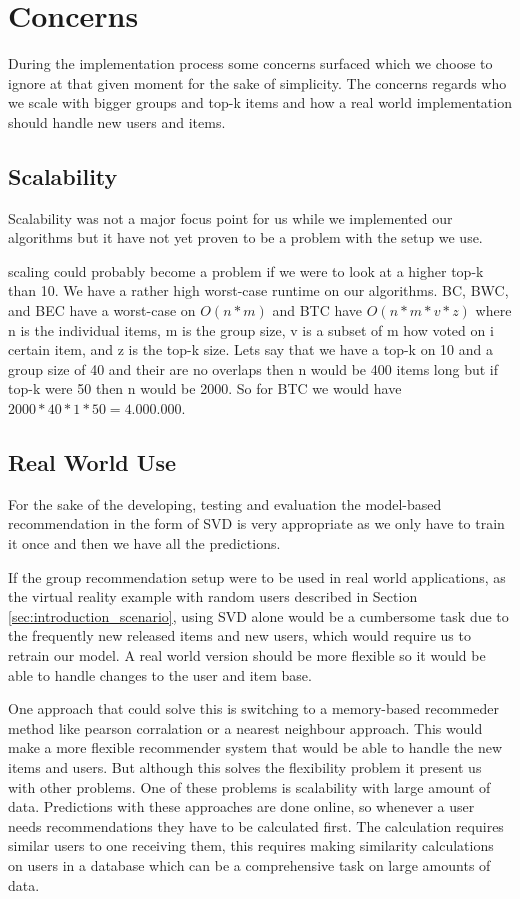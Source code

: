 \section{Concerns}
During the implementation process some concerns surfaced which we choose to ignore at that given moment for the sake of simplicity. The concerns regards who we scale with bigger groups and top-k items and how a real world implementation should handle new users and items.

\subsection{Scalability}
Scalability was not a major focus point for us while we implemented our algorithms but it have not yet proven to be a problem with the setup we use. 

scaling could probably become a problem if we were to look at a higher top-k than 10. We have a rather high worst-case runtime on our algorithms. BC, BWC, and BEC have a worst-case on $O(n*m)$ and BTC have $O(n*m*v*z)$ where n is the individual items, m is the group size, v is a subset of m how voted on i certain item, and z is the top-k size. Lets say that we have a top-k on 10 and a group size of 40 and their are no overlaps then n would be 400 items long but if top-k were 50 then n would be 2000. So for BTC we would have $2000 * 40 * 1 * 50 = 4.000.000$.

\subsection{Real World Use}
For the sake of the developing, testing and evaluation the model-based recommendation in the form of SVD is very appropriate as we only have to train it once and then we have all the predictions. 

If the group recommendation setup were to be used in real world applications, as the virtual reality example with random users described in Section \ref{sec:introduction_scenario}, using SVD alone would be a cumbersome task due to the frequently new released items and new users, which would require us to retrain our model. A real world version should be more flexible so it would be able to handle changes to the user and item base. 

One approach that could solve this is switching to a memory-based recommeder method like pearson corralation or a nearest neighbour approach. This would make a more flexible recommender system that would be able to handle the new items and users. But although this solves the flexibility problem it present us with other problems. One of these problems is scalability with large amount of data\cite{DBLP:conf/adaptive/SchaferFHS07}. Predictions with these approaches are done online, so whenever a user needs recommendations they have to be calculated first. The calculation requires similar users to one receiving them, this requires making similarity calculations on users in a database which can be a comprehensive task on large amounts of data.

